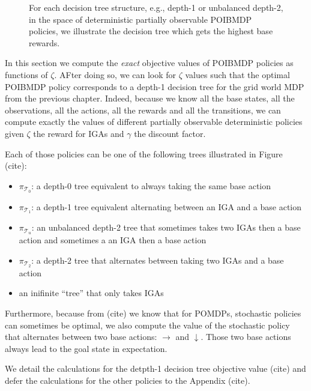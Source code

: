 \begin{figure}[htbp]
    \caption{For each decision tree structure, e.g., depth-1 or unbalanced depth-2, in the space of deterministic partially observable POIBMDP policies, we illustrate the decision tree which gets the highest base rewards.}
    \label{fig:optimal-policy-trees}
\end{figure}

In this section we compute the \textit{exact} objective values of POIBMDP policies as functions of $\zeta$. AFter doing so, we can look for $\zeta$ values such that the optimal POIBMDP policy corresponds to a depth-1 decision tree for the grid world MDP from the previous chapter.  
Indeed, because we know all the base states, all the observations, all the actions, all the rewards and all the transitions, we can compute exactly the values of different partially observable deterministic policies given $\zeta$ the reward for IGAs and $\gamma$ the discount factor.

Each of those policies can be one of the following trees illustrated in Figure (cite): 
\begin{itemize}
    \item $\pi_{\mathcal{T}_0}$: a depth-0 tree equivalent to always taking the same base action 
    \item $\pi_{\mathcal{T}_1}$: a depth-1 tree equivalent alternating between an IGA and a base action 
    \item $\pi_{\mathcal{T}_u}$: an unbalanced depth-2 tree that sometimes takes two IGAs then a base action and sometimes a an IGA then a base action
    \item $\pi_{\mathcal{T}_2}$: a depth-2 tree that alternates between taking two IGAs and a base action
    \item an inifinite ``tree'' that only takes IGAs
\end{itemize}
Furthermore, because from (cite) we know that for POMDPs, stochastic policies can sometimes be optimal, we also compute the value of the stochastic policy that alternates between two base actions: $\rightarrow$ and $\downarrow$.
Those two base actions always lead to the goal state in expectation.

We detail the calculations for the detpth-1 decision tree objective value (cite) and defer the calculations for the other policies to the Appendix (cite).

